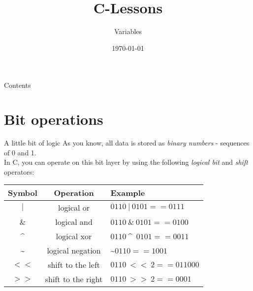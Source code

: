 


\title{C-Lessons}
\subtitle{Variables}
\date{\today}





\maketitle


\begin{frame}{Contents}
	\tableofcontents
\end{frame}

\section{Bit operations}

\begin{frame}{A little bit of logic}
	As you know, all data is stored as \textit{binary numbers} - sequences of 0 and 1.\\
	In C, you can operate on this bit layer by using the following \textit{logical bit} and \textit{shift} operators:\bigskip
	
	\begin{tabular}{|c|c|l|}
																						  	  \hline
		\textbf{Symbol} 	& \textbf{Operation} 	& \textbf{Example} 							\\\hline
		$|$					& logical or				& $0110\ |\ 0101 == 0111$ 		\\\hline
		$\&$ 				& logical and 				& $0110\ \&\ 0101 == 0100$ 	\\\hline
		\textasciicircum				& logical xor 				& $0110\ $\textasciicircum\ $0101 == 0011$ 	\\\hline
		\textasciitilde			& logical negation 			& \textasciitilde $0110 == 1001$	\\\hline
		$<<$ 			& shift to the left 			& $0110\ <<\ 2 == 011000$ 	\\\hline
		$>>$ 		& shift to the right 				& $0110\ >>\ 2 == 0001$ 			\\\hline
	\end{tabular}
	
\end{frame}

